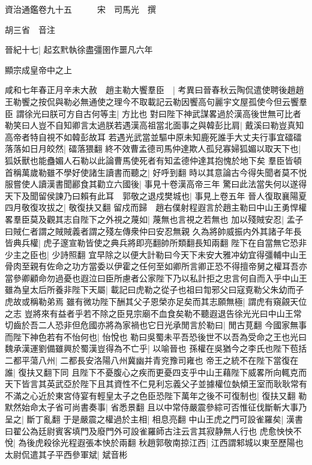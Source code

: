 資治通鑑卷九十五　　　宋　司馬光　撰

胡三省　音注

晉紀十七|{
	起玄黓執徐盡彊圉作噩凡六年}


顯宗成皇帝中之上

咸和七年春正月辛未大赦　趙主勒大饗羣臣　|{
	考異曰晉春秋云陶侃遣使聘後趙趙王勒饗之按侃與勒必無通使之理今不取載記云勒因饗高句麗宇文屋孤使今但云饗羣臣}
謂徐光曰朕可方自古何等主|{
	方比也}
對曰陛下神武謀畧過於漢高後世無可比者勒笑曰人豈不自知卿言太過朕若遇漢高祖當北面事之與韓彭比肩|{
	戴溪曰勒豈真知高帝者特自視不如韓彭故耳}
若遇光武當並驅中原未知鹿死誰手大丈夫行事宜礌礌落落如日月皎然|{
	礌落猥翻}
終不效曹孟德司馬仲達欺人孤兒寡婦狐媚以取天下也|{
	狐妖獸也能蠱媚人石勒以此論曹馬使死者有知孟德仲達其抱愧於地下矣}
羣臣皆頓首稱萬歲勒雖不學好使諸生讀書而聽之|{
	好呼到翻}
時以其意論古今得失聞者莫不悦服嘗使人讀漢書聞酈食其勸立六國後|{
	事見十卷漢高帝三年}
驚曰此法當失何以遂得天下及聞留侯諫乃曰賴有此耳　郭敬之退戍樊城也|{
	事見上卷五年}
晉人復取襄陽夏四月敬復攻拔之|{
	敬復扶又翻}
留戍而歸　趙右僕射程遐言於趙主勒曰中山王勇悍權畧羣臣莫及觀其志自陛下之外視之蔑如|{
	蔑無也言視之若無也}
加以殘賊安忍|{
	孟子曰賊仁者謂之賊賊義者謂之殘左傳衆仲曰安忍無親}
久為將帥威振内外其諸子年長皆典兵權|{
	虎子邃宣勒皆使之典兵將即亮翻帥所類翻長知兩翻}
陛下在自當無它恐非少主之臣也|{
	少詩照翻}
宜早除之以便大計勒曰今天下未安大雅冲幼宜得彊輔中山王骨肉至親有佐命之功方當委以伊霍之任何至如卿所言卿正恐不得擅帝舅之權耳吾亦當參卿顧命勿過憂也遐泣曰臣所慮者公家陛下乃以私計拒之忠言何自而入乎中山王雖為皇太后所養非陛下天屬|{
	載記曰虎勒之從子也祖曰㔨邪父曰寇覔勒父朱幼而子虎故或稱勒弟焉}
雖有微功陛下酬其父子恩榮亦足矣而其志願無極|{
	謂虎有窺覦天位之志}
豈將來有益者乎若不除之臣見宗廟不血食矣勒不聽遐退告徐光光曰中山王常切齒於吾二人恐非但危國亦將為家禍也它日光承閒言於勒曰|{
	閒古莧翻}
今國家無事而陛下神色若有不怡何也|{
	怡悅也}
勒曰吳蜀未平吾恐後世不以吾為受命之王也光曰魏承漢運劉備雖興於蜀漢豈得為不亡乎|{
	以喻晉也}
孫權在吳猶今之李氏也陛下苞括二都平蕩八州|{
	二都長安洛陽八州冀幽并青兖豫司雍也}
帝王之統不在陛下當復在誰|{
	復扶又翻下同}
且陛下不憂腹心之疾而更憂四支乎中山王藉陛下威畧所向輒克而天下皆言其英武亞於陛下且其資性不仁見利忘義父子並據權位埶傾王室而耿耿常有不滿之心近於東宮侍宴有輕皇太子之色臣恐陛下萬年之後不可復制也|{
	復扶又翻}
勒默然始命太子省可尚書奏事|{
	省悉景翻}
且以中常侍嚴震參綜可否惟征伐斷斬大事乃呈之|{
	斷丁亂翻}
于是嚴震之權過於主相|{
	相息亮翻}
中山王虎之門可設雀羅矣|{
	漢書曰翟公為廷尉賓客填門及廢門外可設雀羅師古注云言其寂静無人行也}
虎愈怏怏不悅|{
	為後虎殺徐光程遐張本怏於兩翻}
秋趙郭敬南掠江西|{
	江西謂邾城以東至歷陽也}
太尉侃遣其子平西參軍斌|{
	斌音彬}
